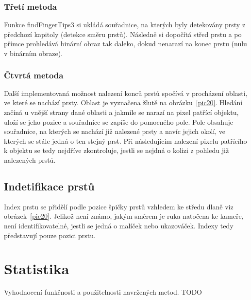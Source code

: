 \subsubsection{Třetí metoda}
Funkce findFingerTips3 si ukládá souřadnice, na kterých byly detekovány prsty z předchozí kapitoly (detekce směru prstů). Následně si dopočítá střed prstu a po přímce prohledává binární obraz tak daleko, dokud nenarazí na konec prstu (nulu v binárním obraze). 

\subsubsection{Čtvrtá metoda}
Další implementovaná možnost nalezení konců prstů spočívá v procházení oblasti, ve které se nachází prsty. Oblast je vyznačena žlutě na obrázku~\ref{pic20}. Hledání začíná u vnější strany dané oblasti a jakmile se narazí na pixel patřící objektu, uloží se jeho pozice a souřadnice se zapíše do pomocného pole. Pole obsahuje souřadnice, na kterých se nachází již nalezené prsty a navíc jejich okolí, ve kterých se stále jedná o ten stejný prst. Při následujícím nalezení pixelu patřícího k objektu se tedy nejdříve zkontroluje, jestli se nejdná o kolizi z pohledu již nalezených prstů.

\subsection{Indetifikace prstů}
Index prstu se přidělí podle pozice špičky prstů vzhledem ke středu dlaně viz obrázek~\ref{pic20}. Jelikož není známo, jakým směrem je ruka natočena ke kameře, není identifikovatelné, jestli se jedná o malíček nebo ukazováček. Indexy tedy představují pouze pozici prstu.

\section{Statistika}
Vyhodnocení funkčnosti a použitelnosti navržených metod.
TODO

\endinput
